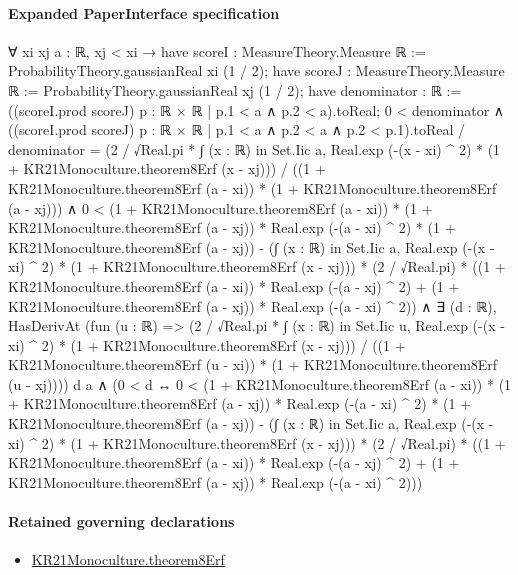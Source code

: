 \documentclass[10pt]{article}
\begin{document}
\paragraph{Expanded PaperInterface specification}
\begin{ReviewVerbatim}
∀ {xi xj a : ℝ},
  xj < xi →
    have scoreI : MeasureTheory.Measure ℝ := ProbabilityTheory.gaussianReal xi (1 / 2);
    have scoreJ : MeasureTheory.Measure ℝ := ProbabilityTheory.gaussianReal xj (1 / 2);
    have denominator : ℝ := ((scoreI.prod scoreJ) {p : ℝ × ℝ | p.1 < a ∧ p.2 < a}).toReal;
    0 < denominator ∧
      ((scoreI.prod scoreJ) {p : ℝ × ℝ | p.1 < a ∧ p.2 < a ∧ p.2 < p.1}).toReal / denominator =
          (2 / √Real.pi *
              ∫ (x : ℝ) in Set.Iic a, Real.exp (-(x - xi) ^ 2) * (1 + KR21Monoculture.theorem8Erf (x - xj))) /
            ((1 + KR21Monoculture.theorem8Erf (a - xi)) * (1 + KR21Monoculture.theorem8Erf (a - xj))) ∧
        0 <
            (1 + KR21Monoculture.theorem8Erf (a - xi)) * (1 + KR21Monoculture.theorem8Erf (a - xj)) *
                  Real.exp (-(a - xi) ^ 2) *
                (1 + KR21Monoculture.theorem8Erf (a - xj)) -
              (∫ (x : ℝ) in Set.Iic a, Real.exp (-(x - xi) ^ 2) * (1 + KR21Monoculture.theorem8Erf (x - xj))) *
                  (2 / √Real.pi) *
                ((1 + KR21Monoculture.theorem8Erf (a - xi)) * Real.exp (-(a - xj) ^ 2) +
                  (1 + KR21Monoculture.theorem8Erf (a - xj)) * Real.exp (-(a - xi) ^ 2)) ∧
          ∃ (d : ℝ),
            HasDerivAt
                (fun (u : ℝ) =>
                  (2 / √Real.pi *
                      ∫ (x : ℝ) in Set.Iic u, Real.exp (-(x - xi) ^ 2) * (1 + KR21Monoculture.theorem8Erf (x - xj))) /
                    ((1 + KR21Monoculture.theorem8Erf (u - xi)) * (1 + KR21Monoculture.theorem8Erf (u - xj))))
                d a ∧
              (0 < d ↔
                0 <
                  (1 + KR21Monoculture.theorem8Erf (a - xi)) * (1 + KR21Monoculture.theorem8Erf (a - xj)) *
                        Real.exp (-(a - xi) ^ 2) *
                      (1 + KR21Monoculture.theorem8Erf (a - xj)) -
                    (∫ (x : ℝ) in Set.Iic a, Real.exp (-(x - xi) ^ 2) * (1 + KR21Monoculture.theorem8Erf (x - xj))) *
                        (2 / √Real.pi) *
                      ((1 + KR21Monoculture.theorem8Erf (a - xi)) * Real.exp (-(a - xj) ^ 2) +
                        (1 + KR21Monoculture.theorem8Erf (a - xj)) * Real.exp (-(a - xi) ^ 2)))
\end{ReviewVerbatim}

\paragraph{Retained governing declarations}
\begin{itemize}\raggedright
\item \hyperlink{paper-prerequisite-89a4972e4c2bbebd}{KR21\allowbreak{}Monoculture.\allowbreak{}theorem8\allowbreak{}Erf}
\end{itemize}
\end{document}
